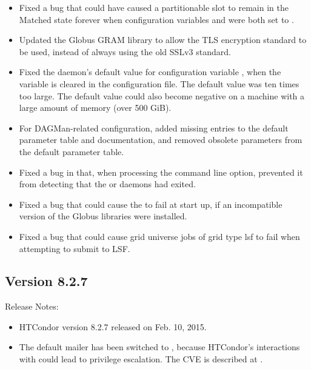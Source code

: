 \begin{itemize}
\item Fixed a bug that could have caused a partitionable slot to remain in
the Matched state forever when configuration variables
 and 
were both set to .

\item Updated the Globus GRAM library to allow the TLS encryption standard
to be used, instead of always using the old SSLv3 standard.

\item Fixed the  daemon's default value for configuration 
variable , 
when the variable is cleared in the configuration file.
The default value was ten times too large.
The default value could also become negative on a machine with a large
amount of memory (over 500 GiB).

\item For DAGMan-related configuration,
added missing entries to the default parameter table and documentation,
and removed obsolete parameters from the default parameter table.

\item Fixed a bug in  that, 
when processing the  command line option,
prevented it from detecting that the 
 or  daemons had exited.

\item Fixed a bug that could cause the  to fail at start up,
if an incompatible version of the Globus libraries were installed.

\item Fixed a bug that could cause grid universe jobs of grid type lsf
to fail when attempting to submit to LSF.

\end{itemize}

\subsection*{\label{sec:New-8-2-7}Version 8.2.7}

\noindent Release Notes:

\begin{itemize}

\item HTCondor version 8.2.7 released on Feb. 10, 2015.

\item \Security The default mailer has been switched to ,
because HTCondor's interactions with  could lead
to privilege escalation.
The CVE is described at
.

\end{itemize}



